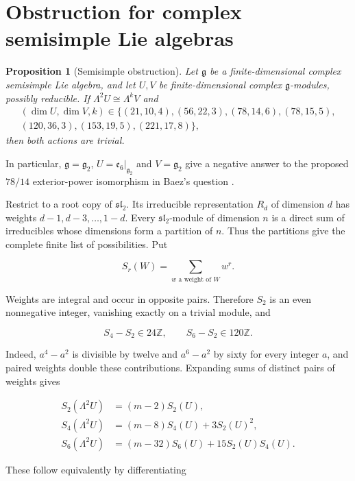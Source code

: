\documentclass[11pt,a4paper]{article}
\newtheorem{proposition}{Proposition}[section]
\begin{document}
\section{Obstruction for complex semisimple Lie algebras}\label{sec:obstruction}

\begin{proposition}[Semisimple obstruction]\label{prop:C1}
Let $\mathfrak g$ be a finite-dimensional complex semisimple Lie algebra, and let $U,V$ be finite-dimensional complex $\mathfrak g$-modules, possibly reducible. If $\Lambda^2U\cong\Lambda^kV$ and
\[
\begin{gathered}
(\dim U,\dim V,k)\in
\{(21,10,4),(56,22,3),(78,14,6),(78,15,5),\\
(120,36,3),(153,19,5),(221,17,8)\},
\end{gathered}
\]
then both actions are trivial.
\end{proposition}

In particular, $\mathfrak g=\mathfrak g_2$, $U=\mathfrak e_6|_{\mathfrak g_2}$ and $V=\mathfrak g_2$ give a negative answer to the proposed $78/14$ exterior-power isomorphism in Baez's question \citep{Baez2026Coincidences}.

Restrict to a root copy of \(\mathfrak{sl}_2\). Its irreducible representation \(R_d\) of dimension \(d\) has weights \(d-1,d-3,\ldots,1-d\). Every \(\mathfrak{sl}_2\)-module of dimension \(n\) is a direct sum of irreducibles whose dimensions form a partition of \(n\). Thus the partitions give the complete finite list of possibilities. Put

\[
S_r(W)=\sum_{w\text{ a weight of }W} w^r.
\]

Weights are integral and occur in opposite pairs. Therefore \(S_2\) is an even nonnegative integer, vanishing exactly on a trivial module, and

\[
S_4-S_2\in24\mathbb Z,\qquad S_6-S_2\in120\mathbb Z.
\]

Indeed, \(a^4-a^2\) is divisible by twelve and \(a^6-a^2\) by sixty for every integer \(a\), and paired weights double these contributions. Expanding sums of distinct pairs of weights gives

\[
\begin{aligned}
S_2(\Lambda^2U)&=(m-2)S_2(U),\\
S_4(\Lambda^2U)&=(m-8)S_4(U)+3S_2(U)^2,\\
S_6(\Lambda^2U)&=(m-32)S_6(U)+15S_2(U)S_4(U).
\end{aligned}
\]

These follow equivalently by differentiating
\end{document}
